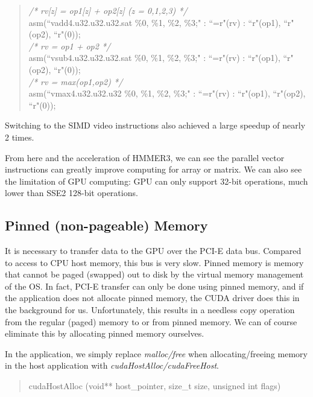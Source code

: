 \begin{quote}
\selectfont
 \textsl{/* rv[z] = op1[z] + op2[z] (z = 0,1,2,3) */}\\
 asm(``vadd4.u32.u32.u32.sat \%0, \%1, \%2, \%3;" : ``=r"(rv) : ``r"(op1), ``r"(op2), ``r"(0));\\
 \textsl{/* rv = op1 + op2 */}\\
 asm(``vsub4.u32.u32.u32.sat \%0, \%1, \%2, \%3;" : ``=r"(rv) : ``r"(op1), ``r"(op2), ``r"(0));\\
 \textsl{/* rv = max(op1,op2) */}\\
 asm(``vmax4.u32.u32.u32 \%0, \%1, \%2, \%3;" : ``=r"(rv) : ``r"(op1), ``r"(op2), ``r"(0));
\end{quote}

Switching to the SIMD video instructions also achieved a large speedup of nearly 2 times.

From here and the acceleration of HMMER3, we can see the parallel vector instructions can greatly improve computing for array or matrix. We can also see the limitation of GPU computing: GPU can only support 32-bit operations, much lower than SSE2 128-bit operations.

\subsection{Pinned (non-pageable) Memory}
\label{pin}

It is necessary to transfer data to the GPU over the PCI-E data bus. Compared to access to CPU host memory, this bus is very slow. Pinned memory is memory that cannot be paged (swapped) out to disk by the virtual memory management of the OS. In fact, PCI-E transfer can only be done using pinned memory, and if the application does not allocate pinned memory, the CUDA driver does this in the background for us. Unfortunately, this results in a needless copy operation from the regular (paged) memory to or from pinned memory. We can of course eliminate this by allocating pinned memory ourselves.

In the application, we simply replace \emph{malloc/free} when allocating/freeing memory in the host application with \emph{cudaHostAlloc/cudaFreeHost}.

\begin{quote}
\selectfont
 cudaHostAlloc (void** host\_pointer, size\_t size, unsigned int flags)
\end{quote}

